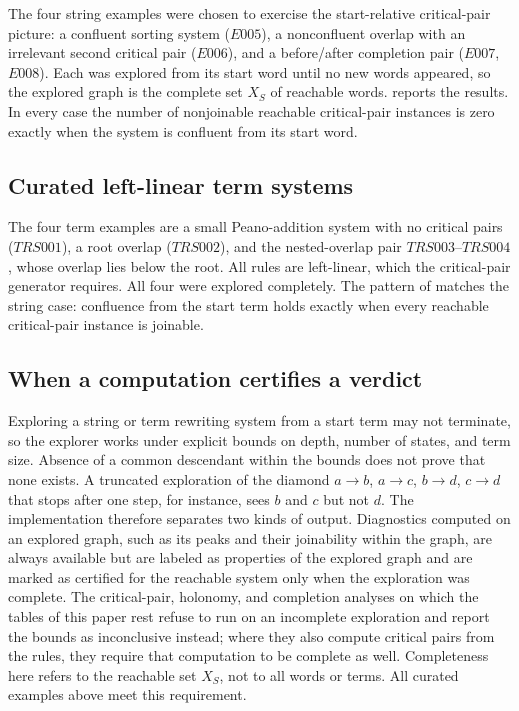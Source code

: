 The four string examples were chosen to exercise the start-relative critical-pair picture: a confluent sorting system ($E005$), a nonconfluent overlap with an irrelevant second critical pair ($E006$), and a before/after completion pair ($E007$, $E008$). Each was explored from its start word until no new words appeared, so the explored graph is the complete set $X_S$ of reachable words.  reports the results. In every case the number of nonjoinable reachable critical-pair instances is zero exactly when the system is confluent from its start word.



\subsection{Curated left-linear term systems}
\label{subsec:curated-trs-bridge}

The four term examples are a small Peano-addition system with no critical pairs ($TRS001$), a root overlap ($TRS002$), and the nested-overlap pair $TRS003$--$TRS004$, whose overlap lies below the root. All rules are left-linear, which the critical-pair generator requires. All four were explored completely. The pattern of  matches the string case: confluence from the start term holds exactly when every reachable critical-pair instance is joinable.



\subsection{When a computation certifies a verdict}
\label{subsec:certification}

Exploring a string or term rewriting system from a start term may not terminate, so the explorer works under explicit bounds on depth, number of states, and term size. Absence of a common descendant within the bounds does not prove that none exists. A truncated exploration of the diamond $a \to b$, $a \to c$, $b \to d$, $c \to d$ that stops after one step, for instance, sees $b$ and $c$ but not $d$. The implementation therefore separates two kinds of output. Diagnostics computed on an explored graph, such as its peaks and their joinability within the graph, are always available but are labeled as properties of the explored graph and are marked as certified for the reachable system only when the exploration was complete. The critical-pair, holonomy, and completion analyses on which the tables of this paper rest refuse to run on an incomplete exploration and report the bounds as inconclusive instead; where they also compute critical pairs from the rules, they require that computation to be complete as well. Completeness here refers to the reachable set $X_S$, not to all words or terms. All curated examples above meet this requirement.


